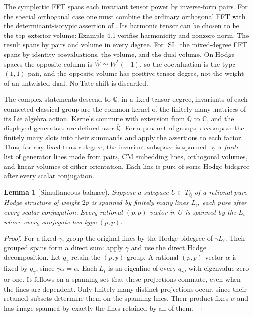 \documentclass[11pt]{article}
\newcommand{\C}{\mathbb C}
\newcommand{\kk}{{\overline{\mathbb Q}}}
\DeclareMathOperator{\SL}{SL}
\newtheorem{lemma}[theorem]{Lemma}
\theoremstyle{remark}
\begin{document}
The symplectic FFT spans each invariant tensor power by inverse-form
pairs. For the special orthogonal case one must combine the ordinary
orthogonal FFT with the determinant-isotypic assertion of
\cite[Theorem 2.1]{LZ17}. Its harmonic tensor can be chosen to be the
top exterior volume: Example 4.1 verifies harmonicity and nonzero norm.
The result spans by pairs and volume in every degree. For $\SL$ the
mixed-degree FFT spans by identity coevaluations, the volume, and the
dual volume. On Hodge spaces the opposite column is
$\bar W\simeq W^*(-1)$, so the coevaluation is the type-$(1,1)$ pair,
and the opposite volume has positive tensor degree, not the weight of
an untwisted dual. No Tate shift is discarded.

The complex statements descend to $\kk$: in a fixed tensor degree,
invariants of each connected classical group are the common kernel of
the finitely many matrices of its Lie algebra action. Kernels commute
with extension from $\kk$ to $\C$, and the displayed generators are
defined over $\kk$. For a product of groups, decompose the finitely many
slots into their summands and apply the assertions to each factor.
Thus, for any fixed tensor degree, the invariant subspace is spanned by
a \emph{finite} list of generator lines made from pairs, CM embedding
lines, orthogonal volumes, and linear volumes of either orientation.
Each line is pure of some Hodge bidegree after every scalar conjugation.

\begin{lemma}[Simultaneous balance]\label{lem:simultaneous}
Suppose a subspace $U\subset T_\kk$ of a rational pure Hodge structure
of weight $2p$ is spanned by finitely many lines $L_i$, each pure after
every scalar conjugation. Every rational $(p,p)$ vector in $U$ is spanned
by the $L_i$ whose every conjugate has type $(p,p)$.
\end{lemma}
\begin{proof}
For a fixed $\gamma$, group the original lines by the Hodge bidegree
of $\gamma L_i$. Their grouped spans form a direct sum: apply $\gamma$
and use the direct Hodge decomposition. Let $q_\gamma$ retain the
$(p,p)$ group. A rational $(p,p)$ vector $\alpha$ is fixed by
$q_\gamma$, since $\gamma\alpha=\alpha$.
Each $L_i$ is an eigenline of every $q_\gamma$, with eigenvalue zero
or one. It follows on a spanning set that these projections commute,
even when the lines are dependent. Only finitely many distinct
projections occur, since their retained subsets determine them on the
spanning lines. Their product fixes $\alpha$ and has image spanned
by exactly the lines retained by all of them.
\end{proof}
\end{document}
